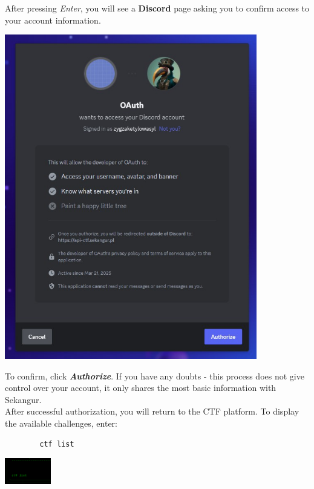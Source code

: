 \documentclass{article}
\begin{document}
After pressing \textit{Enter}, you will see a \textbf{Discord} page asking you to confirm access to your account information.
\begin{center}
    \includegraphics[width=0.825\textwidth]{"image3.jpeg"}
\end{center}
To confirm, click \textit{\textbf{Authorize}}. If you have any doubts - this process does not give control over your account, it only shares the most basic information with Sekangur.
\vspace{3mm} \\
After successful authorization, you will return to the CTF platform. To display the available challenges, enter:
\begin{multicols}{2}
    \begin{verbatim}
        ctf list
    \end{verbatim}
    \columnbreak
    \begin{center}
        \includegraphics[width=0.15\textwidth]{"image4.png"}
    \end{center}
\end{multicols}
\end{document}
